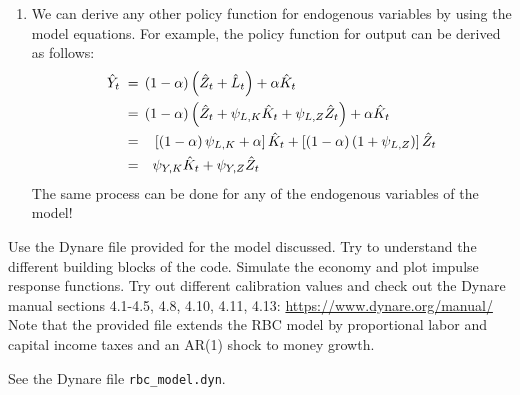 \documentclass[a4paper, 12pt]{article}
\begin{document}
\begin{Answer}
\begin{small}
\begin{enumerate}
				  We have now fully described our policy functions for $\hat{C}_t$, $\hat{L}_t$, and $\hat{K}_{t+1}$.%
			\item[e) ] We can derive any other policy function for endogenous variables by using the model equations. For example, the policy function for output can be derived as follows:%
				\begin{align}%
				\hat{Y}_t \; = & \; \left(1-\alpha\right) \left(\hat{Z}_t + \hat{L}_t\right) + \alpha \hat{K}_t\notag\\%
				= & \; \left(1-\alpha\right) \left(\hat{Z}_t + \psi_{L,K} \hat{K}_t + \psi_{L,Z} \hat{Z}_t \right) + \alpha \hat{K}_t\notag\\%
				= & \quad \left[\left(1-\alpha\right) \psi_{L,K} + \alpha \right] \hat{K}_t + \left[ \left(1-\alpha\right) \left(1+\psi_{L,Z}\right) \right] \hat{Z}_t\notag\\%
				= & \quad \psi_{Y,K} \hat{K}_t + \psi_{Y,Z} \hat{Z}_t%
				\end{align}%
				The same process can be done for any of the endogenous variables of the model!%
		\end{enumerate}%
	\end{small}%
\end{Answer}%
\bigskip%
\begin{Exercise}[title={Simulating the Model using Dynare},label=ex_3]%
	Use the Dynare file provided for the model discussed. Try to understand the different building blocks of the code. Simulate the economy and plot impulse response functions. Try out different calibration values and check out the Dynare manual sections 4.1-4.5, 4.8, 4.10, 4.11, 4.13: \href{https://www.dynare.org/manual/}{https://www.dynare.org/manual/} Note that the provided file extends the RBC model by proportional labor and capital income taxes and an AR(1) shock to money growth.%
\end{Exercise}%
\bigskip%
\begin{Answer}%
	See the Dynare file \texttt{rbc\_model.dyn}.%
\end{Answer}%
\bigskip%
\end{document}
